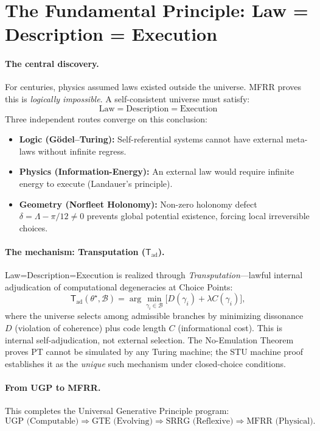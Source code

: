 \documentclass[11pt]{article}
\newcommand{\Trans}{\ensuremath{{\mathsf{T}_{\mathrm{ad}}}}}
\begin{document}
\section{The Fundamental Principle: Law = Description = Execution}

\paragraph{The central discovery.}
For centuries, physics assumed laws existed outside the universe. MFRR proves this is \emph{logically impossible}. A self-consistent universe must satisfy:
\[
\boxed{\text{Law}=\text{Description}=\text{Execution}}
\]
Three independent routes converge on this conclusion:
\begin{itemize}[nosep]
\item \textbf{Logic (Gödel--Turing):} Self-referential systems cannot have external meta-laws without infinite regress.
\item \textbf{Physics (Information-Energy):} An external law would require infinite energy to execute (Landauer's principle).
\item \textbf{Geometry (Norfleet Holonomy):} Non-zero holonomy defect $\delta=\Lambda-\pi/12\neq 0$ prevents global potential existence, forcing local irreversible choices.
\end{itemize}

\paragraph{The mechanism: Transputation (\Trans).}
Law=Description=Execution is realized through \emph{Transputation}---lawful internal adjudication of computational degeneracies at Choice Points:
\[
\Trans(\theta^\star,\mathcal B)=
\arg\min_{\gamma_i\in\mathcal B}\!
\big[D(\gamma_i)+\lambda C(\gamma_i)\big],
\]
where the universe selects among admissible branches by minimizing dissonance $D$ (violation of coherence) plus code length $C$ (informational cost). This is internal self-adjudication, not external selection. The No-Emulation Theorem proves PT cannot be simulated by any Turing machine; the STU machine proof establishes it as the \emph{unique} such mechanism under closed-choice conditions.

\paragraph{From UGP to MFRR.}
This completes the Universal Generative Principle program:
\[
\text{UGP (Computable)} \Rightarrow \text{GTE (Evolving)} \Rightarrow \text{SRRG (Reflexive)} \Rightarrow \text{MFRR (Physical)}.
\]
\end{document}
